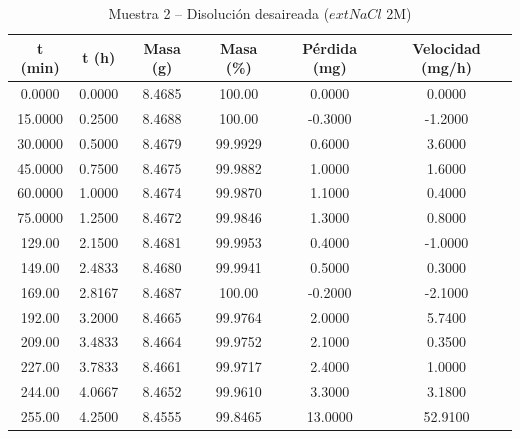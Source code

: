 \documentclass[11pt,a4paper]{article}
\begin{document}
\begin{table}[H]
\centering
\caption{Muestra 2 -- Disolución desaireada ($	ext{NaCl}$ 2M)}
\label{tab:3_3_des2}
\begin{tabular}{cccccc}
\toprule
t (min) & t (h) & Masa (g) & Masa (\%) & Pérdida (mg) & Velocidad (mg/h) \\
\midrule
0.0000 & 0.0000 & 8.4685 & 100.00 & 0.0000 & 0.0000 \\
15.0000 & 0.2500 & 8.4688 & 100.00 & -0.3000 & -1.2000 \\
30.0000 & 0.5000 & 8.4679 & 99.9929 & 0.6000 & 3.6000 \\
45.0000 & 0.7500 & 8.4675 & 99.9882 & 1.0000 & 1.6000 \\
60.0000 & 1.0000 & 8.4674 & 99.9870 & 1.1000 & 0.4000 \\
75.0000 & 1.2500 & 8.4672 & 99.9846 & 1.3000 & 0.8000 \\
129.00 & 2.1500 & 8.4681 & 99.9953 & 0.4000 & -1.0000 \\
149.00 & 2.4833 & 8.4680 & 99.9941 & 0.5000 & 0.3000 \\
169.00 & 2.8167 & 8.4687 & 100.00 & -0.2000 & -2.1000 \\
192.00 & 3.2000 & 8.4665 & 99.9764 & 2.0000 & 5.7400 \\
209.00 & 3.4833 & 8.4664 & 99.9752 & 2.1000 & 0.3500 \\
227.00 & 3.7833 & 8.4661 & 99.9717 & 2.4000 & 1.0000 \\
244.00 & 4.0667 & 8.4652 & 99.9610 & 3.3000 & 3.1800 \\
255.00 & 4.2500 & 8.4555 & 99.8465 & 13.0000 & 52.9100 \\
\bottomrule
\end{tabular}
\end{table}
\end{document}
